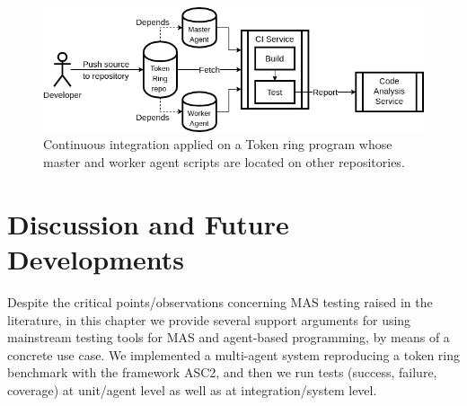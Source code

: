 \begin{figure}[t!]
  \centering
  \hspace{-5pt}
  \includegraphics[width=1\linewidth]{ch_emas/ci.png}
  \caption{Continuous integration applied on a Token ring program whose master and worker agent scripts are located on other repositories.}
  \label{fig:ci}
\end{figure}


\section{Discussion and Future Developments}
\label{sec:discussion}

Despite the critical points/observations concerning MAS testing raised in the literature, in this chapter we %
provide several support arguments for using  mainstream testing tools for MAS and agent-based programming, by means of a concrete use case. We implemented a multi-agent system reproducing a token ring benchmark with the framework ASC2, and then we run tests (success, failure, coverage) at unit/agent level as well as at integration/system level. 




